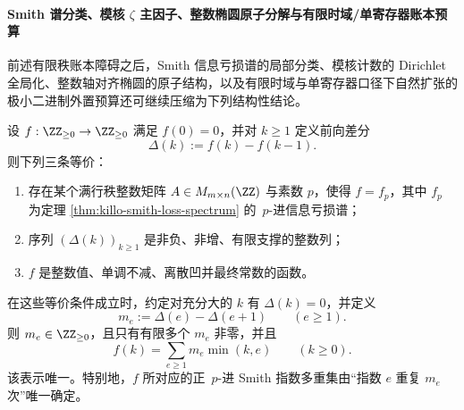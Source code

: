 \paragraph{Smith 谱分类、模核 \texorpdfstring{$\zeta$}{zeta} 主因子、整数椭圆原子分解与有限时域/单寄存器账本预算}
前述有限秩账本障碍之后，Smith 信息亏损谱的局部分类、模核计数的 Dirichlet 全局化、整数轴对齐椭圆的原子结构，以及有限时域与单寄存器口径下自然扩张的极小二进制外置预算还可继续压缩为下列结构性结论。

\begin{theorem}\label{thm:xi-smith-padic-loss-spectrum-classification}
设 \(f:\ZZ_{\ge 0}\to \ZZ_{\ge 0}\) 满足 \(f(0)=0\)，并对 \(k\ge 1\) 定义前向差分
\[
\Delta(k):=f(k)-f(k-1).
\]
则下列三条等价：
\begin{enumerate}
  \item 存在某个满行秩整数矩阵 \(A\in M_{m\times n}(\ZZ)\) 与素数 \(p\)，使得 \(f=f_p\)，其中 \(f_p\) 为定理 \ref{thm:killo-smith-loss-spectrum} 的 \(\,p\)-进信息亏损谱；
  \item 序列 \((\Delta(k))_{k\ge 1}\) 是非负、非增、有限支撑的整数列；
  \item \(f\) 是整数值、单调不减、离散凹并最终常数的函数。
\end{enumerate}
在这些等价条件成立时，约定对充分大的 \(k\) 有 \(\Delta(k)=0\)，并定义
\[
m_e:=\Delta(e)-\Delta(e+1)\qquad(e\ge 1).
\]
则 \(m_e\in\ZZ_{\ge 0}\)，且只有有限多个 \(m_e\) 非零，并且
\[
f(k)=\sum_{e\ge 1}m_e\min(k,e)\qquad(k\ge 0).
\]
该表示唯一。特别地，\(f\) 所对应的正 \(\,p\)-进 Smith 指数多重集由“指数 \(e\) 重复 \(m_e\) 次”唯一确定。
\end{theorem}
